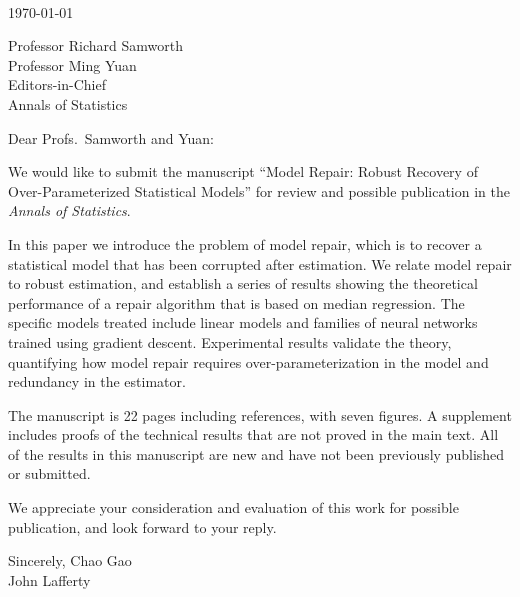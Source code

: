 \documentclass[11pt]{article}
\begin{document}
\thispagestyle{empty}
\mbox{\ }
\vskip1in

\today{}

Professor Richard Samworth\\
Professor Ming Yuan\\
Editors-in-Chief\\
Annals of Statistics
\vskip10pt

Dear Profs.~Samworth and Yuan:

We would like to submit the manuscript ``Model Repair: Robust Recovery of Over-Parameter\-ized Statistical Models'' for review and
possible publication in the {\it Annals of Statistics}.

In this paper we introduce the problem of model repair, which is
to recover a statistical model that has been corrupted after estimation. We relate
model repair to robust estimation, and establish a series of results showing the theoretical performance of a repair algorithm that is based on median regression. The specific models treated include linear models and families of neural networks trained using gradient descent. Experimental results validate the theory, quantifying how model repair requires over-parameterization in the model and redundancy in the estimator.

The manuscript is 22 pages including references, with seven figures.  A supplement includes
proofs of the technical results that are not proved in the main text. All of the
results in this manuscript are new and have not been previously published or submitted.

We appreciate your consideration and evaluation of this work for possible
publication, and look forward to your reply.

Sincerely,
\vskip5pt
Chao Gao\\
John Lafferty
\end{document}
